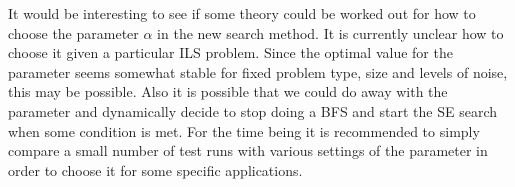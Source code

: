 \documentclass[12pt,Bold,letterpaper]{mcgilletdclass}
\begin{document}
It would be interesting to see if some theory could be worked out for how to choose the parameter $\alpha$ in the new search method. It is currently unclear how to choose it given a particular ILS problem. Since the optimal value for the parameter seems somewhat stable for fixed problem type, size and levels of noise, this may be possible. Also it is possible that we could do away with the parameter and dynamically decide to stop doing a BFS and start the SE search when some condition is met. For the time being it is recommended to simply compare a small number of test runs with various settings of the parameter in order to choose it for some specific applications.








\end{document}
